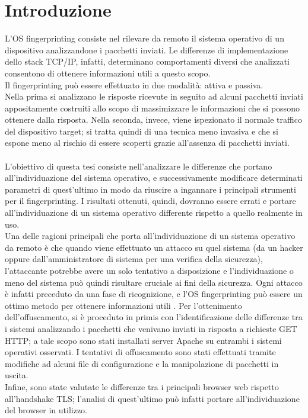 \chapter{Introduzione}
\label{introduzione}

L'OS fingerprinting consiste nel rilevare da remoto il sistema operativo di un dispositivo analizzandone i pacchetti inviati. Le differenze di implementazione dello stack TCP/IP, infatti, determinano comportamenti diversi che analizzati consentono di ottenere informazioni utili a questo scopo. \\
Il fingerprinting può essere effettuato in due modalità: attiva e passiva. \\ 
Nella prima si analizzano le risposte ricevute in seguito ad alcuni pacchetti inviati appositamente costruiti allo scopo di massimizzare le informazioni che si possono ottenere dalla risposta.
Nella seconda, invece, viene ispezionato il normale traffico del dispositivo target; si tratta quindi di una tecnica meno invasiva e che si espone meno al rischio di essere scoperti grazie all'assenza di pacchetti inviati.
\\
\\
L'obiettivo di questa tesi consiste nell'analizzare le differenze che portano all'individuazione del sistema operativo, e successivamente modificare determinati parametri di quest'ultimo in modo da riuscire a ingannare i principali strumenti per il fingerprinting.
I risultati ottenuti, quindi, dovranno essere errati e portare all'individuazione di un sistema operativo differente rispetto a quello realmente in uso.\\
Una delle ragioni principali che porta all'individuazione di un sistema operativo da remoto è che quando viene effettuato un attacco su quel sistema (da un hacker oppure dall'amministratore di sistema per una verifica della sicurezza), l'attaccante potrebbe avere un solo tentativo a disposizione \cite{ragioni} e l'individuazione o meno del sistema può quindi risultare cruciale ai fini della sicurezza. Ogni attacco è infatti preceduto da una fase di ricognizione, e l'OS fingerprinting può essere un ottimo metodo per ottenere informazioni utili \cite{prof}.
Per l'ottenimento dell'offuscamento, si è proceduto in primis con l'identificazione delle differenze tra i sistemi analizzando i pacchetti che venivano inviati in risposta a richieste GET HTTP; a tale scopo sono stati installati server Apache su entrambi i sistemi operativi osservati. I tentativi di offuscamento sono stati effettuati tramite modifiche ad alcuni file di configurazione e la manipolazione di pacchetti in uscita.
\\
Infine, sono state valutate le differenze tra i principali browser web rispetto all'handshake TLS; l'analisi di quest'ultimo può infatti portare all'individuazione del browser in utilizzo.










